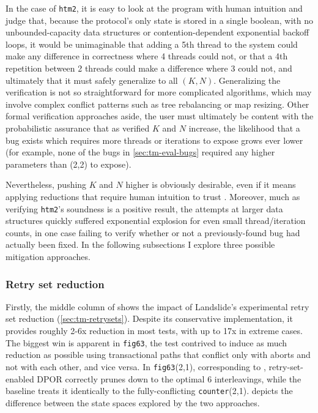 In the case of {\tt htm2},
it is easy to look at the program with human intuition and judge that,
because the protocol's only state is stored in a single boolean,
with no unbounded-capacity data structures or
contention-dependent exponential backoff loops,
it would be unimaginable that adding a 5th thread to the system
could make any difference in correctness where 4 threads could not,
or that a 4th repetition between 2 threads could make a difference where 3 could not,
and ultimately that it must safely generalize to all $(K, N)$.
Generalizing the verification is not so straightforward
for more complicated algorithms,
which may involve complex conflict patterns such as tree rebalancing or map resizing.
Other formal verification approaches aside,
the user must ultimately be content with the probabilistic assurance that
as verified $K$ and $N$ increase,
the likelihood that a bug exists which requires more threads or iterations to expose grows ever lower
(for example, none of the bugs in \cref{sec:tm-eval-bugs} required any higher parameters than (2,2) to expose).

Nevertheless, pushing $K$ and $N$ higher is obviously desirable,
even if it means applying reductions that require human intuition to trust . %
Moreover, much as verifying {\tt htm2}'s soundness is a positive result,
the attempts at larger data structures quickly suffered exponential explosion
for even small thread/iteration counts,
in one case
failing to verify whether or not a previously-found bug had actually been fixed.
In the following subsections I explore three possible mitigation approaches.

\subsubsection{Retry set reduction}
\label{sec:tm-eval-retrysets}

Firstly, the middle column of 
shows the impact of Landslide's experimental retry set reduction (\cref{sec:tm-retrysets}).
Despite its conservative implementation,
it provides roughly 2-6x reduction in most tests, with up to 17x in extreme cases.
The biggest win is apparent in {\tt fig63},
the test contrived to induce as much reduction as possible
using transactional paths that conflict only with aborts and not with each other, and vice versa.
In {\tt fig63}(2,1), corresponding to ,
retry-set-enabled DPOR correctly prunes down to the optimal 6 interleavings,
while the baseline treats it identically to the fully-conflicting {\tt counter}(2,1).
 depicts the difference between the state spaces explored by the two approaches.

